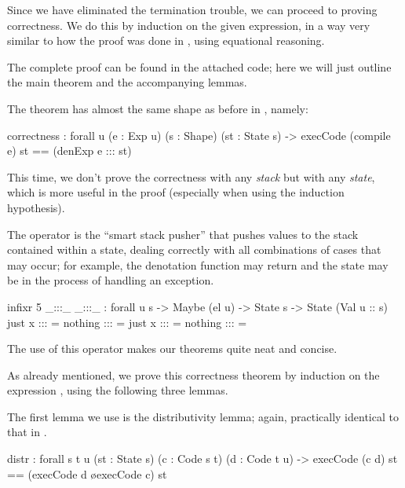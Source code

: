 Since we have eliminated the termination trouble, we can proceed to proving
correctness. We do this by induction on the given expression, in a way
very similar to how the proof was done in , using
equational reasoning.


The complete proof can be found
in the attached code; here we will just outline the main theorem and the
accompanying lemmas.

The theorem has almost the same shape as before in ,
namely:
\begin{code}
  correctness : forall {u} (e : Exp u) (s : Shape) (st : State s)
    -> execCode (compile e) st == (denExp e ::: st)
\end{code}\label{sec:hau-correctness}

\noindent This time, we don't prove the correctness with any \emph{stack} but
with any \emph{state}, which is more useful in the proof (especially when
using the induction hypothesis).

The operator \ident{:::} is the ``smart stack pusher'' that pushes values
to the stack contained within a state, dealing correctly with all combinations
of cases that may occur; for example, the denotation function 
may return  and the state  may be in the process
of handling an exception.

\begin{codei}
  infixr 5 _:::_
  _:::_ : forall {u s} -> Maybe (el u) -> State s -> State (Val u :: s)
  just x	:::	\tick[ st ]		= \tick[ x \scons st ]
  nothing	:::	\tick[ st ]		= 
  just x	:::	\x[ n , st ]	= \x[ n , st ]
  nothing	:::	\x[ n , st ]	= \x[ n , st ]
\end{codei}

\noindent The use of this operator makes our theorems quite neat and concise.

As already mentioned, we prove this correctness theorem by induction on the
expression , using the following three lemmas.

The first lemma we use is the distributivity lemma; again, practically
identical to that in .
\begin{code}
  distr : forall {s t u} (st : State s) (c : Code s t) (d : Code t u)
    -> execCode (c \app d) st == (execCode d \o execCode c) st
\end{code}

